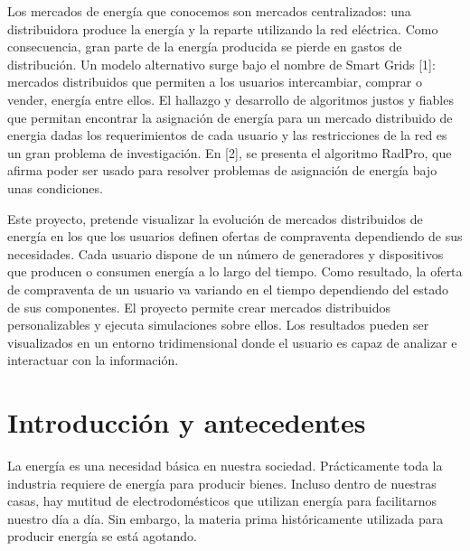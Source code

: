 \documentclass[12pt,a4paper,openright,oneside]{article}
\numberwithin{equation}{section}
\theoremstyle{definition}
\begin{document}
Los mercados de energía que conocemos son mercados centralizados: una distribuidora produce la energía y la reparte utilizando la red eléctrica. Como consecuencia, gran parte de la energía producida se pierde en gastos de distribución. Un modelo alternativo surge bajo el nombre de Smart Grids [1]: mercados distribuidos que permiten a los usuarios intercambiar, comprar o vender, energía entre ellos. El hallazgo y desarrollo de algoritmos justos y fiables que permitan encontrar la asignación de energía para un mercado distribuido de energia dadas los requerimientos de cada usuario y las restricciones de la red es un gran problema de investigación. En [2], se presenta el algoritmo RadPro, que afirma poder ser usado para resolver problemas de asignación de energía bajo unas condiciones.

Este proyecto, pretende visualizar la evolución de mercados distribuidos de energía en los que los usuarios definen ofertas de compraventa dependiendo de sus necesidades. Cada usuario dispone de un número de generadores y dispositivos que producen o consumen energía a lo largo del tiempo. Como resultado, la oferta de compraventa de un usuario va variando en el tiempo dependiendo del estado de sus componentes. El proyecto permite crear mercados distribuidos personalizables y ejecuta simulaciones sobre ellos. Los resultados pueden ser visualizados en un entorno tridimensional donde el usuario es capaz de analizar e interactuar con la información.
\newpage 

\tableofcontents

\newpage

\setcounter{page}{1}


\section{Introducción y antecedentes}

La energía es una necesidad básica en nuestra sociedad. Prácticamente toda la industria requiere de energía para producir bienes. Incluso dentro de nuestras casas, hay mutitud de electrodomésticos que utilizan energía para facilitarnos nuestro día a día. Sin embargo, la materia prima históricamente utilizada para producir energía se está agotando.
\end{document}
